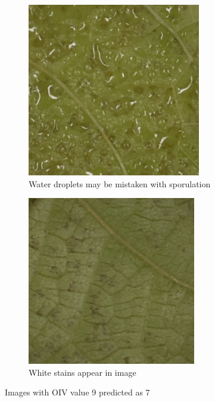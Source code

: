 \documentclass[english]{article}
\begin{document}
\begin{figure}[H]
    \centering
    \begin{subfigure}[b]{0.45\linewidth}
        \includegraphics[width=\linewidth]{water.png}
        \caption{Water droplets may be mistaken with sporulation}\label{fig:error97water}
    \end{subfigure}
    \begin{subfigure}[b]{0.45\linewidth}
        \includegraphics[width=\linewidth]{error_97.png}
        \caption{White stains appear in image}\label{fig:error97b}
    \end{subfigure}
    \caption{Images with OIV value 9 predicted as 7}\label{fig:errors97}
\end{figure}
\end{document}
